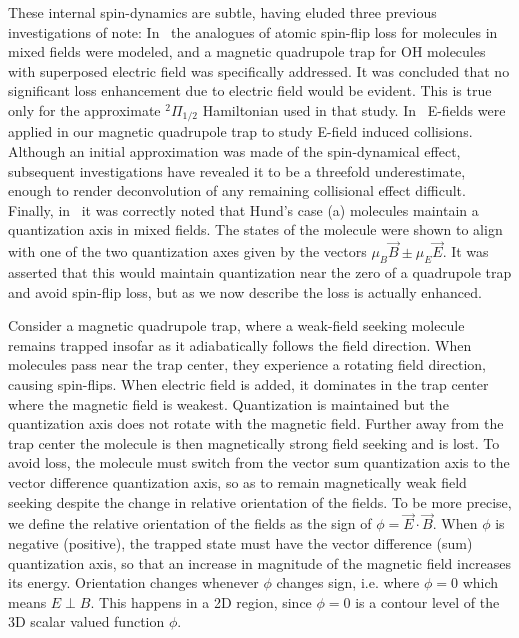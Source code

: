 \documentclass[%
 reprint,
 amsmath,amssymb,
 aps,
prl,
]{revtex4-1}
\newcommand{\red}[1]{{\color{black} #1}}
\newcommand{\epb}{{$E\!\perp\!B$}}
\begin{document}
These internal spin-dynamics are subtle, having eluded three previous investigations of note: In~\cite{Lara2008} the analogues of atomic spin-flip loss for molecules in mixed fields were modeled, and a magnetic quadrupole trap for OH molecules with superposed electric field was specifically addressed. It was concluded that no significant loss enhancement due to electric field would be evident. This is true only for the approximate $^2\Pi_{1/2}$ Hamiltonian used in that study. In~\cite{Stuhl2013} E-fields were applied in our magnetic quadrupole trap to study E-field induced collisions. Although an initial approximation was made of the spin-dynamical effect, subsequent investigations have revealed it to be a threefold underestimate, enough to render deconvolution of any remaining collisional effect difficult. Finally, in~\cite{Bohn2013} it was correctly noted that Hund's case (a) molecules maintain a quantization axis in mixed fields. 
\red{The states of the molecule were shown to align with one of the two quantization axes given by the vectors $\mu_B\vec{B}\pm\mu_E\vec{E}$. It was asserted that this would maintain quantization near the zero of a quadrupole trap and avoid spin-flip loss, but as we now describe the loss is actually enhanced.}


Consider a magnetic quadrupole trap, where a weak-field seeking molecule remains trapped insofar as it adiabatically follows the field direction. When molecules pass near the trap center, they experience a rotating field direction, causing spin-flips. When electric field is added, it dominates in the trap center where the magnetic field is weakest. Quantization is maintained but the quantization axis does not rotate with the magnetic field. Further away from the trap center the molecule is then magnetically strong field seeking and is lost. To avoid loss, the molecule must switch from the vector sum quantization axis to the vector difference quantization axis, so as to remain magnetically weak field seeking despite the change in relative orientation of the fields. To be more precise, we define the relative orientation of the fields as the sign of $\phi=\vec{E}\cdot\vec{B}$. When $\phi$ is negative (positive), the trapped state must have the vector difference (sum) quantization axis, so that an increase in magnitude of the magnetic field increases its energy. Orientation changes whenever $\phi$ changes sign, i.e. where $\phi=0$ which means \epb. This happens in a 2D region, since $\phi=0$ is a contour level of the 3D scalar valued function $\phi$. 
\end{document}
